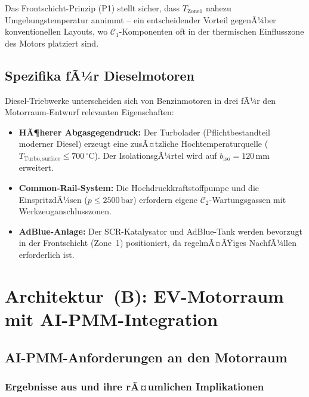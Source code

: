 ﻿\documentclass[12pt,a4paper]{article}
\begin{document}
Das Frontschicht-Prinzip (P1) stellt sicher, dass $T_\mathrm{Zone1}$ nahezu
Umgebungstemperatur annimmt -- ein entscheidender Vorteil gegenÃ¼ber konventionellen
Layouts, wo $\mathcal{C}_1$-Komponenten oft in der thermischen Einflusszone des
Motors platziert sind.

\subsection{Spezifika fÃ¼r Dieselmotoren}

Diesel-Triebwerke unterscheiden sich von Benzinmotoren in drei fÃ¼r den
Motorraum-Entwurf relevanten Eigenschaften:

\begin{itemize}[leftmargin=*]
	\item \textbf{HÃ¶herer Abgasgegendruck:} Der Turbolader (Pflichtbestandteil
	moderner Diesel) erzeugt eine zusÃ¤tzliche Hochtemperaturquelle
	($T_\mathrm{Turbo,surface} \leq 700\,^\circ\mathrm{C}$). Der IsolationsgÃ¼rtel
	wird auf $b_\mathrm{iso} = 120\,\mathrm{mm}$ erweitert.
	\item \textbf{Common-Rail-System:} Die Hochdruckkraftstoffpumpe und die
	EinspritzdÃ¼sen ($p \leq 2500\,\mathrm{bar}$) erfordern eigene
	$\mathcal{C}_2$-Wartungsgassen mit Werkzeuganschlusszonen.
	\item \textbf{AdBlue-Anlage:} Der SCR-Katalysator und AdBlue-Tank werden
	bevorzugt in der Frontschicht (Zone~1) positioniert, da regelmÃ¤ÃŸiges
	NachfÃ¼llen erforderlich ist.
\end{itemize}

\section{Architektur~(B): EV-Motorraum mit AI-PMM-Inte\-gration}
\label{sec:architektur_b}

\subsection{AI-PMM-Anforderungen an den Motorraum}

\subsubsection{Ergebnisse aus \cite{Epp2026liion} und ihre rÃ¤umlichen Implikationen}
\end{document}
